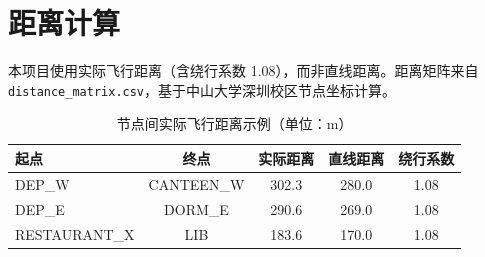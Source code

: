 \documentclass[12pt,a4paper]{article}
\begin{document}
\section{距离计算}

本项目使用实际飞行距离（含绕行系数 1.08），而非直线距离。距离矩阵来自 \texttt{distance\_matrix.csv}，基于中山大学深圳校区节点坐标计算。

\begin{table}[h]
\centering
\caption{节点间实际飞行距离示例（单位：m）}
\begin{tabular}{lcccc}
\toprule
起点 & 终点 & 实际距离 & 直线距离 & 绕行系数 \\
\midrule
DEP\_W & CANTEEN\_W & 302.3 & 280.0 & 1.08 \\
DEP\_E & DORM\_E & 290.6 & 269.0 & 1.08 \\
RESTAURANT\_X & LIB & 183.6 & 170.0 & 1.08 \\
\bottomrule
\end{tabular}
\end{table}
\end{document}

